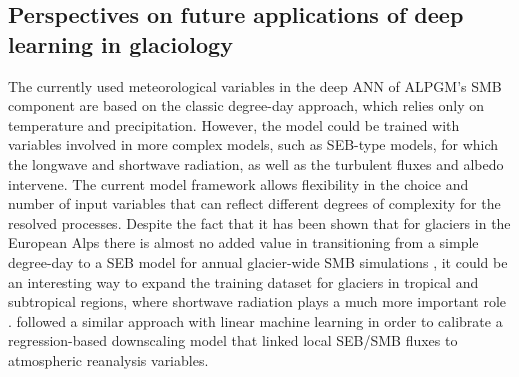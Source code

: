 \subsection{Perspectives on future applications of deep learning in glaciology} \label{methods:deeplearning}

The currently used meteorological variables in the deep ANN of ALPGM’s SMB component are based on the classic degree-day approach, which relies only on temperature and precipitation. However, the model could be trained with variables involved in more complex models, such as SEB-type models, for which the longwave and shortwave radiation, as well as the turbulent fluxes and albedo intervene. The current model framework allows flexibility in the choice and number of input variables that can reflect different degrees of complexity for the resolved processes. Despite the fact that it has been shown that for glaciers in the European Alps there is almost no added value in transitioning from a simple degree-day to a SEB model for annual glacier-wide SMB simulations \cite[e.g.,][]{reveillet_which_2017}, it could be an interesting way to expand the training dataset for glaciers in tropical and subtropical regions, where shortwave radiation plays a much more important role \citep{benn_glaciers_2014}. \citet{maussion_enso_2015} followed a similar approach with linear machine learning in order to calibrate a regression-based downscaling model that linked local SEB/SMB fluxes to atmospheric reanalysis variables. 

